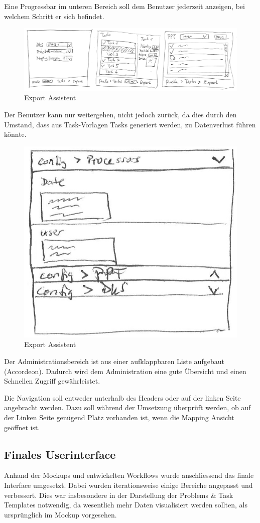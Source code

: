 		Eine Progressbar im unteren Bereich soll dem Benutzer jederzeit anzeigen, bei welchem Schritt er sich befindet.
		
		\begin{figure}[H]
			\includegraphics[width=\linewidth]{interfacesAndProtocols/media/img/exportWorkflow.jpg}
			\caption{Export Assistent}
			\label{fig:exportAssistent}
		\end{figure}	
		
		Der Benutzer kann nur weitergehen, nicht jedoch zurück, da dies durch den Umstand, 
		dass aus Task-Vorlagen Tasks generiert werden, 
		zu Datenverlust führen könnte.
		
		\begin{figure}[H]
			\centering
			\includegraphics[width=0.3\linewidth]{interfacesAndProtocols/media/img/administration.jpg}
			\caption{Export Assistent}
			\label{fig:administration}
		\end{figure}	
		
		Der Administrationsbereich ist aus einer aufklappbaren Liste aufgebaut (Accordeon). Dadurch wird dem Administration eine gute Übersicht und einen Schnellen Zugriff gewährleistet.
		
		Die Navigation soll entweder unterhalb des Headers oder auf der linken Seite angebracht werden. Dazu soll während der Umsetzung überprüft werden, ob auf der Linken Seite genügend Platz vorhanden ist, wenn die Mapping Ansicht geöffnet ist.
		
		
	\subsection{Finales Userinterface}
	
		Anhand der Mockups und entwickelten Workflows wurde anschliessend das finale Interface umgesetzt.
		Dabei wurden iterationsweise einige Bereiche angepasst und verbessert.
		Dies war insbesondere in der Darstellung der Problems \& Task Templates notwendig, 
		da wesentlich mehr Daten visualisiert werden sollten, als ursprünglich im Mockup vorgesehen.
		
